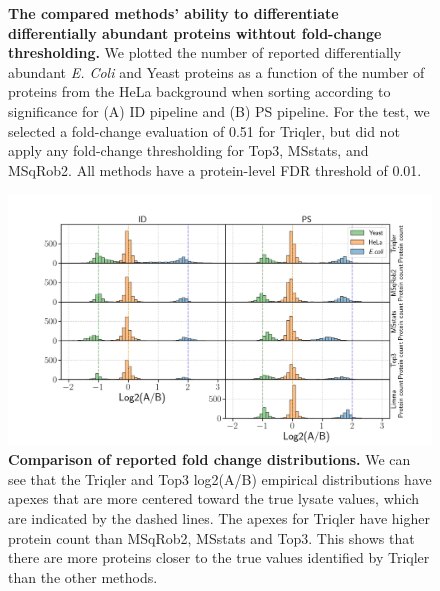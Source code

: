 \documentclass[11pt]{article}
\begin{document}
\begin{figure}[hbt]
\begin{tabular}{lclc}
    \end{tabular}
    \caption{{\bf The compared methods' ability to differentiate differentially abundant proteins withtout fold-change thresholding.} We plotted the number of reported differentially abundant  {\em E. Coli} and Yeast proteins as a function of the number of proteins from the HeLa background when sorting according to significance for (A) ID pipeline and (B) PS pipeline. For the test, we selected a fold-change evaluation of 0.51 for Triqler, but did not apply any fold-change thresholding for Top3, MSstats, and MSqRob2. All methods have a protein-level FDR threshold of 0.01. \label{fig:ability_to_differentiate_differentially_abundant_specie_vs_hela}}
\end{figure}


\begin{figure}[hbt]
    \centering
    \setlength{\tabcolsep}{0pt}

    \includegraphics[width=\linewidth]{../../result/report_plots/gridplot_histogram.png} 


    \caption{{\bf Comparison of reported fold change distributions.} We can see that the Triqler and Top3 log2(A/B) empirical distributions have apexes that are more centered toward the true lysate values, which are indicated by the dashed lines. The apexes for Triqler have higher protein count than MSqRob2, MSstats and Top3. This shows that there are more proteins closer to the true values identified by Triqler than the other methods. \label{fig:fc_histogram_supplement}}
    
\end{figure}
\end{document}
